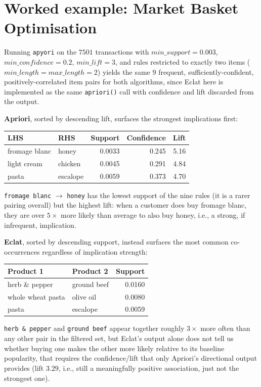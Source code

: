 \documentclass[conference]{IEEEtran}
\begin{document}
\section*{Worked example: Market Basket Optimisation}
Running \texttt{apyori} on the $7501$ transactions with $min\_support=0.003$, $min\_confidence=0.2$, $min\_lift=3$, and rules restricted to exactly two items ($min\_length=max\_length=2$) yields the same $9$ frequent, sufficiently-confident, positively-correlated item pairs for both algorithms, since Eclat here is implemented as the same \texttt{apriori()} call with confidence and lift discarded from the output.

\textbf{Apriori}, sorted by descending lift, surfaces the strongest implications first:
\begin{center}
\begin{tabular}{@{}llrrr@{}}
\toprule
LHS & RHS & Support & Confidence & Lift \\
\midrule
fromage blanc & honey & 0.0033 & 0.245 & 5.16 \\
light cream & chicken & 0.0045 & 0.291 & 4.84 \\
pasta & escalope & 0.0059 & 0.373 & 4.70 \\
\bottomrule
\end{tabular}
\end{center}
\texttt{fromage blanc} $\rightarrow$ \texttt{honey} has the lowest support of the nine rules (it is a rarer pairing overall) but the highest lift: when a customer does buy fromage blanc, they are over $5\times$ more likely than average to also buy honey, i.e., a strong, if infrequent, implication.

\textbf{Eclat}, sorted by descending support, instead surfaces the most common co-occurrences regardless of implication strength:
\begin{center}
\begin{tabular}{@{}llr@{}}
\toprule
Product 1 & Product 2 & Support \\
\midrule
herb \& pepper & ground beef & 0.0160 \\
whole wheat pasta & olive oil & 0.0080 \\
pasta & escalope & 0.0059 \\
\bottomrule
\end{tabular}
\end{center}
\texttt{herb \& pepper} and \texttt{ground beef} appear together roughly $3\times$ more often than any other pair in the filtered set, but Eclat's output alone does not tell us whether buying one makes the other more likely relative to its baseline popularity, that requires the confidence/lift that only Apriori's directional output provides (lift $3.29$, i.e., still a meaningfully positive association, just not the strongest one).
\end{document}
